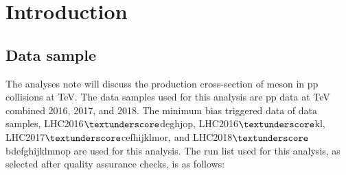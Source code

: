 
\section{Introduction}


 
 
\subsection{Data sample}
\label{sec:data_sample}
The analyses note will discuss the production cross-section of \Dstar meson in pp collisions at  TeV. The data samples used for this analysis are pp data at  TeV combined 2016, 2017, and 2018. The minimum bias triggered data of data samples, LHC2016$\textunderscore$deghjop, LHC2016$\textunderscore$kl, LHC2017$\textunderscore$cefhijklmor, and LHC2018$\textunderscore$bdefghijklmnop are used for this analysis. The run list used for this analysis, as selected after quality assurance checks, is as follows:




